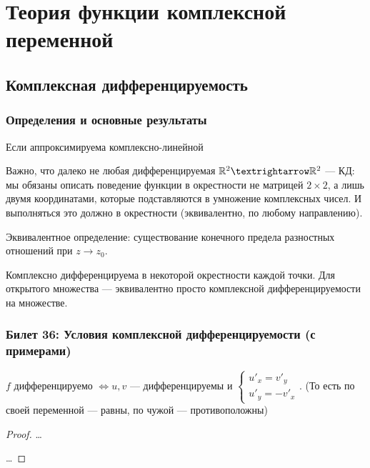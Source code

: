 \documentclass[12pt, a4paper, oneside]{memoir}
\begin{document}
\chapter{Теория функции комплексной переменной}

\section{Комплексная дифференцируемость}

\subsection{Определения и основные результаты}

\begin{definition}

    Если аппроксимируема комплексно-линейной
\end{definition}

Важно, что далеко не любая дифференцируемая $\sR^2 → \sR^2$ — КД:
мы обязаны описать поведение функции в окрестности не матрицей $2×2$, 
а лишь двумя координатами, которые подставляются в умножение комплексных чисел.
И выполняться это должно в окрестности (эквивалентно, по любому направлению).

\begin{remark}
    Эквивалентное определение: существование конечного предела разностных отношений при $z → z_0$.
\end{remark}

\begin{definition}
     Комплексно дифференцируема в некоторой окрестности каждой точки. 
    Для открытого множества — эквивалентно просто комплексной дифференцируемости на множестве.
\end{definition}

\subsection{Билет 36: Условия комплексной дифференцируемости (с примерами)}

\begin{theorem}
    $f$ дифференцируемо $\Leftrightarrow u, v$ — дифференцируемы и $\begin{cases}
        u'_x = v'_y \\ u'_y = -v'_x
    \end{cases}$. (То есть по своей переменной — равны, по чужой — противоположны)

    \begin{proof}
        \rightimp …

        \leftimp …
    \end{proof}
\end{theorem}
\end{document}
